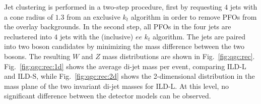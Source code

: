 Jet clustering is performed in a two-step procedure, first by requesting $4$ jets with a cone radius of $1.3$ from an exclusive $k_t$ algorithm in order to remove PFOs from the overlay backgrounds. In the second step, all PFOs in the four jets are reclustered into $4$ jets with the (inclusive) $ee$ $k_t$ algorithm. The jets are paired into two boson candidates by minimizing the mass difference between the two bosons. The resulting $W$ and $Z$ mass distributions
are shown in Fig.~\ref{fig:qgc:rec}. Fig.~\ref{fig:qgc:rec:1d} shows the average di-jet mass per event, comparing ILD-L and ILD-S, while Fig.~\ref{fig:qgc:rec:2d} shows the 2-dimensional distribution in the mass plane of the two invariant di-jet masses for ILD-L. At this level, no significant difference between the detector models can be observed.


